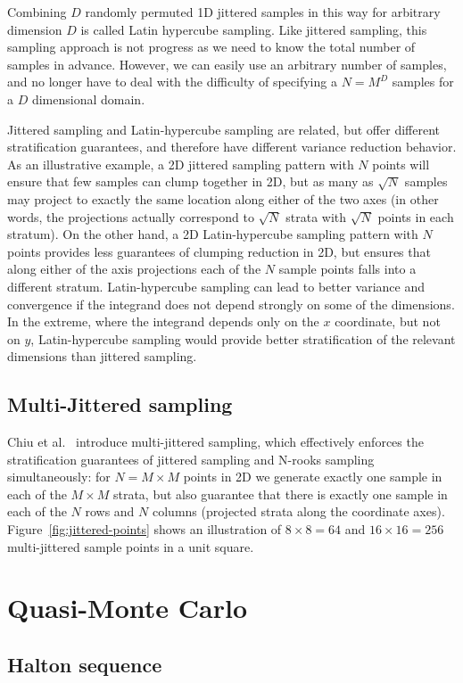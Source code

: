 \documentclass[11pt,fleqn]{book} %
\newcommand{\TBC} {}
\begin{document}
Combining $D$ randomly permuted 1D jittered samples in this way for arbitrary dimension $D$ is called Latin hypercube sampling. Like jittered sampling, this sampling approach is not progress as we need to know the total number of samples in advance. However, we can easily use an arbitrary number of samples, and no longer have to deal with the difficulty of specifying a $N = M^D$ samples for a $D$ dimensional domain.

Jittered sampling and Latin-hypercube sampling are related, but offer different stratification guarantees, and therefore have different variance reduction behavior. As an illustrative example, a 2D jittered sampling pattern with $N$ points will ensure that few samples can clump together in 2D, but as many as $\sqrt{N}$ samples may project to exactly the same location along either of the two axes (in other words, the projections actually correspond to $\sqrt{N}$ strata with $\sqrt{N}$ points in each stratum). On the other hand, a 2D Latin-hypercube sampling pattern with $N$ points provides less guarantees of clumping reduction in 2D, but ensures that along either of the axis projections each of the $N$ sample points falls into a different stratum. Latin-hypercube sampling can lead to better variance and convergence if the integrand does not depend strongly on some of the dimensions. In the extreme, where the integrand depends only on the $x$ coordinate, but not on $y$, Latin-hypercube sampling would provide better stratification of the relevant dimensions than jittered sampling.

\subsection{Multi-Jittered sampling}
Chiu et al.~\cite{chiu94multi} introduce multi-jittered sampling, which effectively enforces the stratification guarantees of jittered sampling and N-rooks sampling simultaneously: for $N=M\times M$ points in 2D we generate exactly one sample in each of the $M\times M$ strata, but also guarantee that there is exactly one sample in each of the $N$ rows and $N$ columns (projected strata along the coordinate axes). Figure~\ref{fig:jittered-points} shows an illustration of $8\times8 = 64$ and $16\times16 = 256$ multi-jittered sample points in a unit square.

\section{Quasi-Monte Carlo}
\subsection{Halton sequence}
\TBC
\end{document}
